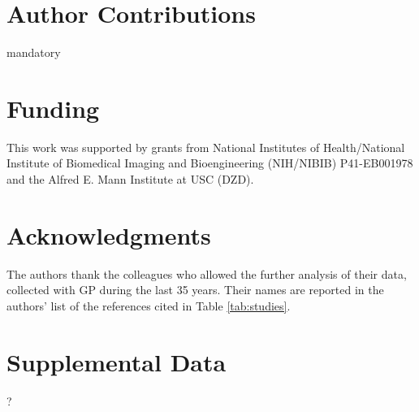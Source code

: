 \documentclass[utf8]{frontiersSCNS} %
\begin{document}
\section*{Author Contributions}
mandatory

\section*{Funding}
This work was supported by grants from National Institutes of Health/National Institute of Biomedical Imaging and Bioengineering (NIH/NIBIB) P41-EB001978 and the Alfred E. Mann Institute at USC (DZD).

\section*{Acknowledgments}
The authors thank the colleagues who allowed the further analysis of their data, collected with GP during the last 35 years. Their names are reported in the authors' list of the references cited in Table \ref{tab:studies}.

\section*{Supplemental Data}
?

\end{document}
